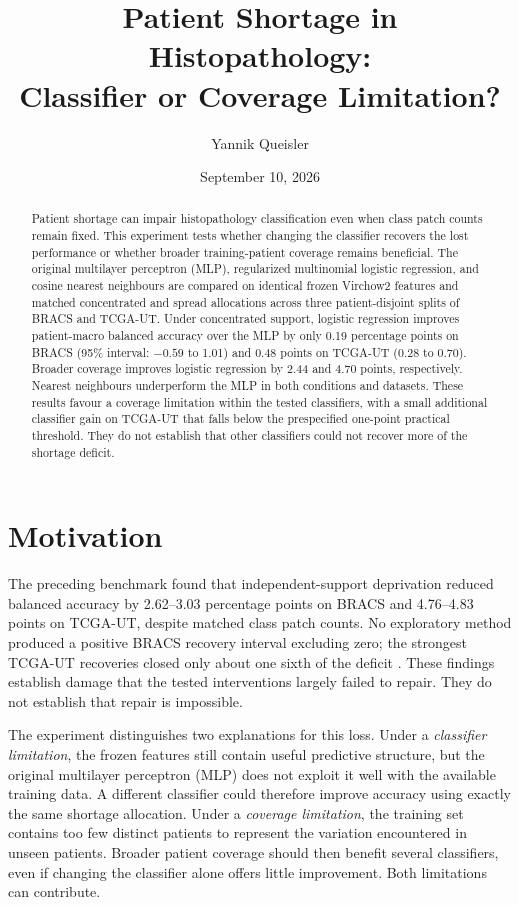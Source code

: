 \documentclass[11pt]{article}
\title{Patient Shortage in Histopathology:\\Classifier or Coverage Limitation?}
\author{Yannik Queisler}
\date{September 10, 2026}
\begin{document}
\raggedbottom
\setlength{\emergencystretch}{2em}
\maketitle
\begin{abstract}
\noindent Patient shortage can impair histopathology classification even when class patch counts remain fixed. This experiment tests whether changing the classifier recovers the lost performance or whether broader training-patient coverage remains beneficial. The original multilayer perceptron (MLP), regularized multinomial logistic regression, and cosine nearest neighbours are compared on identical frozen Virchow2 features and matched concentrated and spread allocations across three patient-disjoint splits of BRACS and TCGA-UT. Under concentrated support, logistic regression improves patient-macro balanced accuracy over the MLP by only 0.19 percentage points on BRACS (95\% interval: $-0.59$ to 1.01) and 0.48 points on TCGA-UT (0.28 to 0.70). Broader coverage improves logistic regression by 2.44 and 4.70 points, respectively. Nearest neighbours underperform the MLP in both conditions and datasets. These results favour a coverage limitation within the tested classifiers, with a small additional classifier gain on TCGA-UT that falls below the prespecified one-point practical threshold. They do not establish that other classifiers could not recover more of the shortage deficit.
\end{abstract}

\tableofcontents
\clearpage

\section{Motivation}
\label{sec:question}
The preceding benchmark found that independent-support deprivation reduced balanced accuracy by \num{2.62}--\num{3.03} percentage points on BRACS and \num{4.76}--\num{4.83} points on TCGA-UT, despite matched class patch counts. No exploratory method produced a positive BRACS recovery interval excluding zero; the strongest TCGA-UT recoveries closed only about one sixth of the deficit \citep{queisler2026benchmarkResults}. These findings establish damage that the tested interventions largely failed to repair. They do not establish that repair is impossible.

The experiment distinguishes two explanations for this loss. Under a \emph{classifier limitation}, the frozen features still contain useful predictive structure, but the original multilayer perceptron (MLP) does not exploit it well with the available training data. A different classifier could therefore improve accuracy using exactly the same shortage allocation. Under a \emph{coverage limitation}, the training set contains too few distinct patients to represent the variation encountered in unseen patients. Broader patient coverage should then benefit several classifiers, even if changing the classifier alone offers little improvement. Both limitations can contribute.
\end{document}

